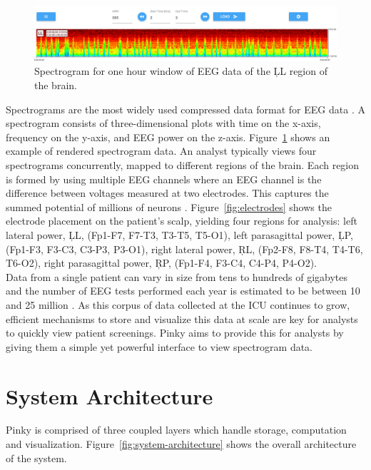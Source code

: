 \begin{figure}[h]
\begin{center}
\includegraphics[scale=0.35]{./img/eeg-view.png}
\caption{Spectrogram for one hour window of EEG data of the \c{LL} region of
  the brain.}
\label{fig:eeg-view}
\end{center}
\end{figure}

Spectrograms are the most widely used compressed data format for EEG data
\cite{ceeg-1}. A spectrogram consists of three-dimensional plots with time on
the x-axis, frequency on the y-axis, and EEG power on the z-axis.
Figure~\ref{fig:eeg-view} shows an example of rendered spectrogram data. An
analyst typically views four spectrograms concurrently, mapped to different
regions of the brain. Each region is formed by using multiple EEG channels
where an EEG channel is the difference between voltages measured at two
electrodes. This captures the summed potential of millions of neurons
\cite{eeg-ml}.  Figure~\ref{fig:electrodes} shows the electrode placement on
the patient's scalp, yielding four regions for analysis: left lateral power,
\c{LL}, (Fp1-F7, F7-T3, T3-T5, T5-O1), left parasagittal power, \c{LP},
(Fp1-F3, F3-C3, C3-P3, P3-O1), right lateral power, \c{RL}, (Fp2-F8, F8-T4,
T4-T6, T6-O2), right parasagittal power, \c{RP}, (Fp1-F4, F3-C4, C4-P4, P4-O2).
\\

Data from a single patient can vary in size from tens to hundreds of gigabytes
and the number of EEG tests performed each year is estimated to be between 10
and 25 million \cite{eeg-scale}. As this corpus of data collected at the ICU
continues to grow, efficient mechanisms to store and visualize this data at
scale are key for analysts to quickly view patient screenings. Pinky aims to
provide this for analysts by giving them a simple yet powerful interface to
view spectrogram data.

\section{System Architecture}

Pinky is comprised of three coupled layers which handle storage, computation
and visualization. Figure~\ref{fig:system-architecture} shows the overall
architecture of the system.

